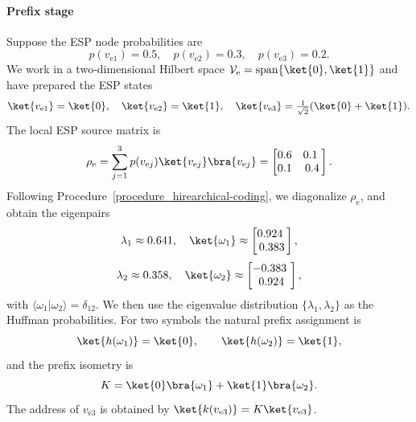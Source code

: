 \documentclass[conference]{IEEEtran}
\begin{document}
\paragraph{Prefix stage}
Suppose the ESP node probabilities are
\[
p(v_{\mathrm{e}1})=0.5,\quad p(v_{\mathrm{e}2})=0.3,\quad p(v_{\mathrm{e}3})=0.2.
\]
We work in a two‑dimensional Hilbert space \(\mathcal V_{\mathrm e}=\mathrm{span}\{\ket{0},\ket{1}\}\) and have prepared the ESP states
\[
\ket{v_{\mathrm{e}1}}=\ket{0},\quad \ket{v_{\mathrm{e}2}}=\ket{1},\quad
\ket{v_{\mathrm{e}3}}=\tfrac{1}{\sqrt{2}}(\ket{0}+\ket{1}).
\]
The local ESP source matrix is
\[
\rho_{\mathrm e}=\sum_{j=1}^3 p(v_{\mathrm{e}j})\ket{v_{\mathrm{e}j}}\bra{v_{\mathrm{e}j}}
=\begin{bmatrix}0.6 & 0.1\

\\0.1 & 0.4\end{bmatrix}.
\]
Following Procedure~\ref{procedure_hirearchical-coding}, we diagonalize \(\rho_{\mathrm e}\), and obtain the eigenpairs
\[
\lambda_1\approx 0.641,\quad \ket{\omega_1}\approx\begin{bmatrix}0.924\
\\0.383\end{bmatrix},
\]
\[
\lambda_2\approx 0.358,\quad \ket{\omega_2}\approx\begin{bmatrix}-0.383\
\\0.924\end{bmatrix},
\]
with \(\langle\omega_1|\omega_2\rangle=\delta_{12}\). We then use the eigenvalue distribution \(\{\lambda_1,\lambda_2\}\) as the Huffman probabilities. For two symbols the natural prefix assignment is
\[
\ket{h(\omega_1)}=\ket{0},\qquad \ket{h(\omega_2)}=\ket{1},
\]
and the prefix isometry is
\[
K=\ket{0}\bra{\omega_1}+\ket{1}\bra{\omega_2}.
\]
The address of \(v_{\mathrm{e}3}\) is obtained by $\ket{k(v_{\mathrm{e}3})}=K\ket{v_{\mathrm{e}3}}$.
\end{document}
